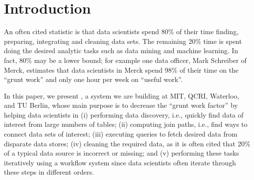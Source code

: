 \section{Introduction}
\label{introduction}

An often cited statistic is that data scientists spend 80\% of their time finding, preparing, integrating and cleaning data sets. The remaining 20\% time is spent doing the desired analytic tasks such as data mining and machine learning. In fact, 80\% may be a lower bound; for example one data officer, Mark Schreiber of Merck, estimates that data scientists in Merck spend 98\% of their time on the ``grunt work'' and only one hour per week on ``useful work''.

In this paper, we present \dcv, a system we are building at MIT, QCRI, Waterloo, and TU Berlin, whose main purpose is to decrease the ``grunt work factor'' by helping data scientists in 
(i) performing data discovery, i.e., quickly find data of interest from large numbers of tables;
(ii) computing join paths, i.e., find ways to connect data sets of interest;
(iii) executing queries to fetch desired data from disparate data stores;
(iv) cleaning the required data, as it is often cited that 20\% of a typical data source is incorrect or missing; and
(v) performing these tasks iteratively using a workflow system since data scientists often iterate through these steps in different orders.


%
%
%
%
%
%
%
%
%
%

